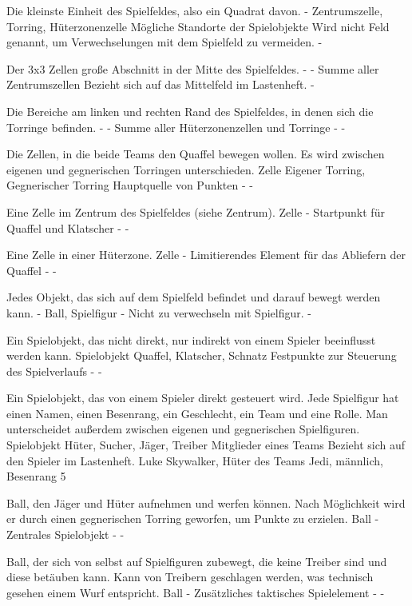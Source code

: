 {Die kleinste Einheit des Spielfeldes, also ein Quadrat davon.}
{-}
{Zentrumszelle, Torring, Hüterzonenzelle}
{Mögliche Standorte der Spielobjekte}
{Wird nicht Feld genannt, um Verwechselungen mit dem Spielfeld zu vermeiden.}
{-}

{Der 3x3 Zellen große Abschnitt in der Mitte des Spielfeldes.}
{-}
{-}
{Summe aller Zentrumszellen}
{Bezieht sich auf das Mittelfeld im Lastenheft.}
{-}

{Die Bereiche am linken und rechten Rand des Spielfeldes, in denen sich die Torringe befinden.}
{-}
{-}
{Summe aller Hüterzonenzellen und Torringe}
{-}
{-}

{Die Zellen, in die beide Teams den Quaffel bewegen wollen. Es wird zwischen eigenen und gegnerischen Torringen unterschieden.}
{Zelle}
{Eigener Torring, Gegnerischer Torring}
{Hauptquelle von Punkten}
{-}
{-}

{Eine Zelle im Zentrum des Spielfeldes (siehe Zentrum).}
{Zelle}
{-}
{Startpunkt für Quaffel und Klatscher}
{-}
{-}

{Eine Zelle in einer Hüterzone.}
{Zelle}
{-}
{Limitierendes Element für das Abliefern der Quaffel}
{-}
{-}

{Jedes Objekt, das sich auf dem Spielfeld befindet und darauf bewegt werden kann.}
{-}
{Ball, Spielfigur}
{-}
{Nicht zu verwechseln mit Spielfigur.}
{-}

{Ein Spielobjekt, das nicht direkt, nur indirekt von einem Spieler beeinflusst werden kann.}
{Spielobjekt}
{Quaffel, Klatscher, Schnatz}
{Festpunkte zur Steuerung des Spielverlaufs}
{-}
{-}

{Ein Spielobjekt, das von einem Spieler direkt gesteuert wird. Jede Spielfigur hat einen Namen, einen Besenrang, ein Geschlecht, ein Team und eine Rolle. Man unterscheidet außerdem zwischen eigenen und gegnerischen Spielfiguren.}
{Spielobjekt}
{Hüter, Sucher, Jäger, Treiber}
{Mitglieder eines Teams}
{Bezieht sich auf den Spieler im Lastenheft.}
{Luke Skywalker, Hüter des Teams \glqq{}Jedi\grqq{}, männlich, Besenrang 5}

{Ball, den Jäger und Hüter aufnehmen und werfen können. Nach Möglichkeit wird er durch einen gegnerischen Torring geworfen, um Punkte zu erzielen.}
{Ball}
{-}
{Zentrales Spielobjekt}
{-}
{-}

{Ball, der sich von selbst auf Spielfiguren zubewegt, die keine Treiber sind und diese betäuben kann. Kann von Treibern geschlagen werden, was technisch gesehen einem Wurf entspricht.}
{Ball}
{-}
{Zusätzliches taktisches Spielelement}
{-}
{-}

